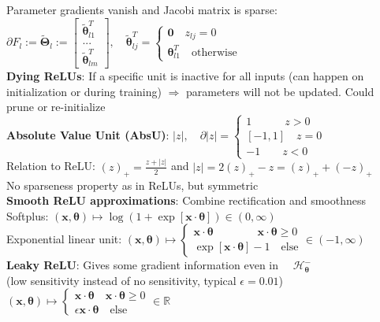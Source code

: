 Parameter gradients vanish and Jacobi matrix is sparse:\\
$\partial F_l:=\tilde{\pmb\Theta}_l:=\begin{bmatrix} \tilde{\pmb\theta}^T_{l1}\\...\\\tilde{\pmb\theta}^T_{lm}
\end{bmatrix}, \quad \tilde{\pmb\theta}^T_{lj}=\begin{cases} \mathbf 0 \quad z_{lj}=0 \\ \pmb\theta^T_{l1} \quad \text{otherwise}\end{cases}$\\
\textbf{Dying ReLUs}: If a specific unit is inactive for all inputs (can happen on initialization or during training) $\Rightarrow$ parameters will not be updated. Could prune or re-initialize\\
\textbf{Absolute Value Unit (AbsU)}: $|z|, \quad \partial |z|=\begin{cases}  1 \quad\quad\quad z>0 \\ [-1,1] \quad z=0 \\ -1 \quad\quad z<0  \end{cases}$\\
Relation to ReLU: $(z)_+=\frac{z+|z|}{2}$ and $|z|=2(z)_+-z=(z)_++(-z)_+$\\
No sparseness property as in ReLUs, but symmetric\\
\textbf{Smooth ReLU approximations}: Combine rectification and smoothness\\
Softplus: $(\mathbf x, \pmb\theta)\mapsto\log(1+\exp[\mathbf x\cdot\pmb\theta])\in(0,\infty)$\\
Exponential linear unit: $(\mathbf x, \pmb\theta)\mapsto\begin{cases} \mathbf x\cdot \pmb\theta \quad\quad\quad\quad \mathbf x\cdot\pmb\theta\geq 0 \\ \exp[\mathbf x\cdot\pmb\theta]-1 \quad \text{else}\end{cases}\in(-1,\infty)$\\
\textbf{Leaky ReLU}: Gives some gradient information even in $\quad\mathcal H_{\pmb \theta}^-$ \\ (low sensitivity instead of no sensitivity, typical $\epsilon=0.01$)\\
$(\mathbf x, \pmb\theta)\mapsto \begin{cases} \mathbf x \cdot \pmb\theta \quad \mathbf x \cdot \pmb\theta\geq 0 \\ \epsilon\mathbf x \cdot \pmb\theta \quad \text{else}  \end{cases}\in\mathbb R$
